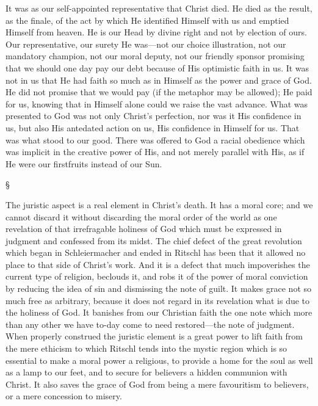 \documentclass[12pt,letterpaper,oneside]{book}
\begin{document}
It was as our self-appointed representative 
that Christ died. He died as the result, as the 
finale, of the act by which He identified Himself 
with us and emptied Himself from heaven. He 
is our Head by divine right and not by election of 
ours. Our representative, our surety He was---not 
our choice illustration, not our mandatory 
champion, not our moral deputy, not our friendly 
sponsor promising that we should one day pay 
our debt because of His optimistic faith in us. 
It was not in us that He had faith so much as in 
Himself as the power and grace of God. He did 
not promise that we would pay (if the metaphor 
may be allowed); He paid for us, knowing that in 
Himself alone could we raise the vast advance. 
What was presented to God was not only 
Christ's perfection, nor was it His confidence in 
us, but also His antedated action on us, His confidence 
in Himself for us. That was what stood 
to our good. There was offered to God a racial 
obedience which was implicit in the creative 
power of His, and not merely parallel with His, 
as if He were our firstfruits instead of our Sun. 

\begin{center}
\S
\end{center}

The juristic aspect is a real element in Christ's 
death. It has a moral core; and we cannot 
discard it without discarding the moral order of 
the world as one revelation of that irrefragable 
holiness of God which must be expressed in 
judgment and confessed from its midst. The 
chief defect of the great revolution which began 
in Schleiermacher and ended in Ritschl has 
been that it allowed no place to that side of 
Christ's work. And it is a defect that much 
impoverishes the current type of religion, beclouds 
it, and robs it of the power of moral conviction 
by reducing the idea of sin and dismissing 
the note of guilt. It makes grace not so much 
free as arbitrary, because it does not regard in 
its revelation what is due to the holiness of God. 
It banishes from our Christian faith the one 
note which more than any other we have to-day 
come to need restored---the note of judgment. 
When properly construed the juristic element is 
a great power to lift faith from the mere 
ethicism to which Ritschl tends into the mystic 
region which is so essential to make a moral 
power a religious, to provide a home for the 
soul as well as a lamp to our feet, and to secure 
for believers a hidden communion with Christ. 
It also saves the grace of God from being a 
mere favouritism to believers, or a mere concession 
to misery. 
\end{document}
